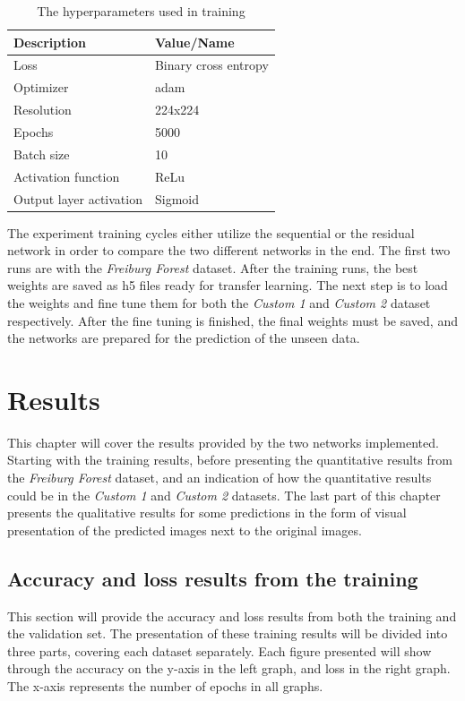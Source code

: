 \documentclass[USenglish]{ifimaster}  %
\begin{document}
\begin{table}[ht]
\centering
\begin{tabular}{ll}
\hline
\textbf{Description} & \textbf{Value/Name}  \\ \hline
Loss &  Binary cross entropy\\
Optimizer &  adam \\
Resolution & 224x224 \\
Epochs &  5000 \\ 
Batch size & 10\\
Activation function & ReLu\\
Output layer activation & Sigmoid \\ \hline
\end{tabular}
\caption{The hyperparameters used in training}
\label{table:hyperparameters}
\end{table}
The experiment training cycles either utilize the sequential or the residual network in order to compare the two different networks in the end. The first two runs are with the \textit{Freiburg Forest} dataset. After the training runs, the best weights are saved as h5 files ready for transfer learning. The next step is to load the weights and fine tune them for both the \textit{Custom 1} and \textit{Custom 2} dataset respectively. After the fine tuning is finished, the final weights must be saved, and the networks are prepared for the prediction of the unseen data. 

\chapter{Results}\label{result} 
This chapter will cover the results provided by the two networks implemented. Starting with the training results, before presenting the quantitative results from the \textit{Freiburg Forest} dataset, and an indication of how the quantitative results could be in the \textit{Custom 1} and \textit{Custom 2} datasets. The last part of this chapter presents the qualitative results for some predictions in the form of visual presentation of the predicted images next to the original images.

\section{Accuracy and loss results from the training}
This section will provide the accuracy and loss results from both the training and the validation set. The presentation of these training results will be divided into three parts, covering each dataset separately. Each figure presented will show through the accuracy on the y-axis in the left graph, and loss in the right graph. The x-axis represents the number of epochs \cite{website:epoch} in all graphs.  
\end{document}
